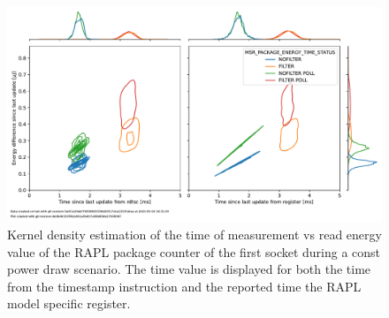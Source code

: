 \begin{figure}[]
    \centering
    \includegraphics[width=\columnwidth]{fig/rapl-update-intervals/MSR_PACKAGE_ENERGY_TIME_STATUS_2000000.pdf}
    \caption{\label{fig:rapl-update-intervals}Kernel density estimation of the time of measurement vs read energy value of the RAPL package counter of the first socket during a const power draw scenario.
    The time value is displayed for both the time from the timestamp instruction and the reported time the RAPL model specific register.}
\end{figure}